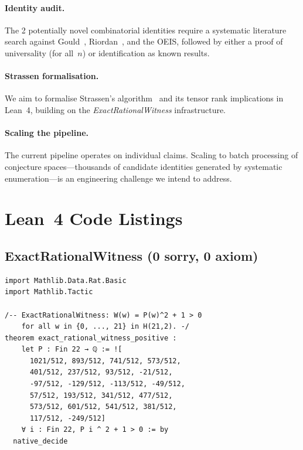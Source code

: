 \documentclass[11pt,a4paper]{article}
\begin{document}
\paragraph{Identity audit.}
The 2 potentially novel combinatorial identities require a systematic
literature search against Gould~\cite{gould1972}, Riordan~\cite{riordan1968},
and the OEIS, followed by either a proof of universality (for all~$n$) or
identification as known results.

\paragraph{Strassen formalisation.}
We aim to formalise Strassen's algorithm~\cite{strassen1969} and its
tensor rank implications in Lean~4, building on the \emph{ExactRationalWitness}
infrastructure.

\paragraph{Scaling the pipeline.}
The current pipeline operates on individual claims. Scaling to batch
processing of conjecture spaces---thousands of candidate identities
generated by systematic enumeration---is an engineering challenge we intend
to address.

\appendix
\section{Lean~4 Code Listings}\label{app:lean}

\subsection{ExactRationalWitness (0 sorry, 0 axiom)}

\begin{lstlisting}[caption={ExactRationalWitness.lean --- positivity certificate for Krawtchouk polynomial witness.},label={lst:witness}]
import Mathlib.Data.Rat.Basic
import Mathlib.Tactic

/-- ExactRationalWitness: W(w) = P(w)^2 + 1 > 0
    for all w in {0, ..., 21} in H(21,2). -/
theorem exact_rational_witness_positive :
    let P : Fin 22 → ℚ := ![
      1021/512, 893/512, 741/512, 573/512,
      401/512, 237/512, 93/512, -21/512,
      -97/512, -129/512, -113/512, -49/512,
      57/512, 193/512, 341/512, 477/512,
      573/512, 601/512, 541/512, 381/512,
      117/512, -249/512]
    ∀ i : Fin 22, P i ^ 2 + 1 > 0 := by
  native_decide
\end{lstlisting}
\end{document}
